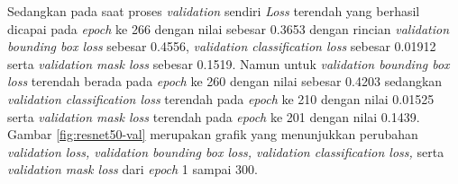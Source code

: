 Sedangkan pada saat proses \textit{validation} sendiri \textit{Loss} terendah yang berhasil dicapai pada \textit{epoch} ke 266 dengan nilai sebesar 0.3653 dengan rincian \textit{validation bounding box loss} sebesar 0.4556, \textit{validation classification loss} sebesar 0.01912 serta \textit{validation mask loss} sebesar 0.1519. Namun untuk \textit{validation bounding box loss} terendah berada pada \textit{epoch} ke 260 dengan nilai sebesar 0.4203 sedangkan \textit{validation classification loss} terendah pada \textit{epoch} ke 210 dengan nilai 0.01525 serta \textit{validation mask loss} terendah pada \textit{epoch} ke 201 dengan nilai 0.1439. Gambar \ref{fig:resnet50-val} merupakan grafik yang menunjukkan perubahan \textit{validation loss, validation bounding box loss, validation classification loss,} serta \textit{validation mask loss} dari \textit{epoch} 1 sampai 300.

